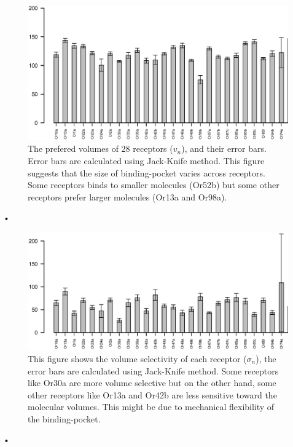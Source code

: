 \documentclass[11pt]{paper} %
\begin{document}
\begin{figure}
\includegraphics[width=\textwidth]{fig/mean-vol}
\caption{The prefered volumes of 28 receptors ($v_n$), and their error bars. Error bars are calculated using Jack-Knife method. 
This figure suggests that the size of binding-pocket varies across receptors. 
Some receptors binds to smaller molecules (Or52b) but some other receptors prefer larger molecules (Or13a and Or98a).}
\label{fig:preferred_volume}
\end{figure}•

\begin{figure}
\includegraphics[width=\textwidth]{fig/std-vol}
\caption{This figure shows the volume selectivity of each receptor ($\sigma_n$), the error bars are calculated using Jack-Knife method.
Some receptors like Or30a are more volume selective but on the other hand, some other receptors like Or13a and Or42b are less sensitive toward the molecular volumes.
This might be due to mechanical flexibility of the binding-pocket.}
\label{fig:volume_selectivity}
\end{figure}•



\end{document}
